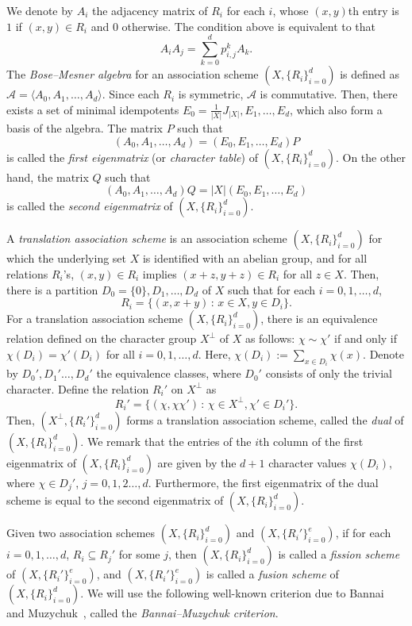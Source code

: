 \documentclass[ALCO,ThmDefs,Unicode]{cedram}
\begin{document}
We denote by $A_i$ the adjacency matrix of $R_i$ for each $i$, whose $(x,y)$th entry is $1$ if $(x,y)\in R_i$ and $0$ otherwise. The condition above is equivalent to that
\[
A_iA_j=\sum_{k=0}^d p_{i,j}^k A_k.
\]
The \emph{Bose--Mesner algebra} for an association scheme $(X,\{R_i\}_{i=0}^d)$ is defined as ${\mathcal A}=\langle A_0,A_1,\ldots,A_d\rangle$. Since each $R_i$ is symmetric, ${\mathcal A}$ is commutative. Then, there exists a set of minimal idempotents $E_0=\frac{1}{|X|}J_{|X|},E_1,\ldots,E_d$, which also form a basis of the algebra. The matrix $P$ such that
\[
(A_0,A_1,\ldots,A_d)=(E_0,E_1,\ldots,E_d)P
\]
is called the \emph{first eigenmatrix} (or \emph{character table}) of $(X,\{R_i\}_{i=0}^{d})$. On the other hand, the matrix $Q$ such that
\[
(A_0,A_1,\ldots,A_d)Q=|X|(E_0,E_1,\ldots,E_d)
\]
is called the \emph{second eigenmatrix} of $(X,\{R_i\}_{i=0}^{d})$.

A \emph{translation association scheme} is an association scheme $(X,\{R_i\}_{i=0}^{d})$ for which the underlying set $X$ is identified with an abelian group, and for all relations $R_i$'s, $(x,y)\in R_i$ implies $(x+z,y+z)\in R_i$ for all $z\in X$. Then, there is a partition $D_0=\{0\},D_1,\ldots,D_d$ of $X$ such that for each $i=0,1,\ldots,d$,
\[
R_i=\{(x,x+y)\,:\,x\in X,y\in D_i\}.
\]
For a translation association scheme $(X,\{R_i\}_{i=0}^{d})$, there is an equivalence relation defined on the character group $X^\perp$ of $X$ as follows: $\chi\sim \chi'$ if and only if $\chi(D_i)=\chi'(D_i)$ for all $i=0,1,\ldots,d$. Here, $\chi(D_i):=\sum_{x\in D_i}\chi(x)$. Denote by $D_0',D_1'\ldots,D_d'$ the equivalence classes, where $D_0'$ consists of only the trivial character. Define the relation $R_i'$ on $X^\perp$ as
\[
R_i'=\{(\chi,\chi \chi')\,:\,\chi \in X^\perp,\chi'\in D_i'\}.
\]
Then, $(X^\perp,\{R_i'\}_{i=0}^d)$ forms a translation association scheme, called the \emph{dual} of $(X,\{R_i\}_{i=0}^{d})$. We remark that the entries of the $i$th column of the first eigenmatrix of $(X,\{R_i\}_{i=0}^{d})$ are given by the $d+1$ character values $\chi(D_i)$, where $\chi\in D_j'$, $j=0,1,2\ldots,d$. Furthermore, the first eigenmatrix of the dual scheme is equal to the second eigenmatrix of $(X,\{R_i\}_{i=0}^{d})$.

Given two association schemes $(X,\{R_i\}_{i=0}^d)$ and $(X,\{R_i'\}_{i=0}^e)$, if for each $i=0,1,\ldots,d$, $R_i\subseteq R_j'$ for some $j$, then $(X,\{R_i\}_{i=0}^d)$ is called a \emph{fission scheme} of $(X,\{R_i'\}_{i=0}^e)$, and $(X,\{R_i'\}_{i=0}^e)$ is called a \emph{fusion scheme} of $(X,\{R_i\}_{i=0}^d)$. We will use the following well-known criterion due to Bannai~\cite{Ba} and Muzychuk~\cite{Mu}, called the \emph{Bannai--Muzychuk criterion}.
\end{document}

